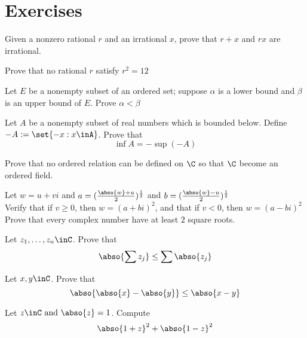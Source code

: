 \documentclass{report}
\begin{document}
\section{Exercises}
\begin{question}{}{}
Given a nonzero rational $r$ and an irrational $x$, prove that $r+x$ and $rx$ are irrational. 
\end{question}
\begin{question}{}{}
Prove that no rational $r$ satisfy  $r^2=12$
\end{question}
\begin{question}{}{}
Let $E$ be a nonempty subset of an ordered set; suppose $\alpha$ is a lower bound and $\beta$ is an upper bound of $E$. Prove $\alpha<\beta$ 
\end{question}
\begin{question}{}{}
Let $A$ be a nonempty subset of real numbers which is bounded below.  Define $-A:=\set{-x: x\inA}$. Prove that
\begin{equation*}
\inf A=-\sup (-A)
\end{equation*}
\end{question}
\begin{question}{}{}
Prove that no ordered relation can be defined on $\C$ so that $\C$ become an ordered field.
\end{question}
\begin{question}{}{}
Let $w=u+vi$ and  $a=(\frac{\abso{w}+u}{2})^{\frac{1}{2}}$ and $b=(\frac{\abso{w}-u}{2})^{\frac{1}{2}}$ \\

Verify that if $v\geq 0$, then  $w=(a+bi)^2$, and that if $v<0$, then $w=(a-bi)^2$\\

Prove that every complex number have at least $2$ square roots.
\end{question}
\begin{question}{}{}
Let $z_1,\dots ,z_n\inC$. Prove that
\begin{equation*}
\abso{\sum z_j}\leq \sum \abso{z_j}
\end{equation*}
\end{question}
\begin{question}{}{}
Let $x,y\inC$. Prove that
 \begin{equation*}
\abso{\abso{x}-\abso{y}}\leq \abso{x-y}
\end{equation*}
\end{question}
\begin{question}{}{}
Let $z\inC\text{ and }\abso{z}=1$. Compute
\begin{equation*}
\abso{1+z}^2+\abso{1-z}^2
\end{equation*}
\end{question}
\end{document}
